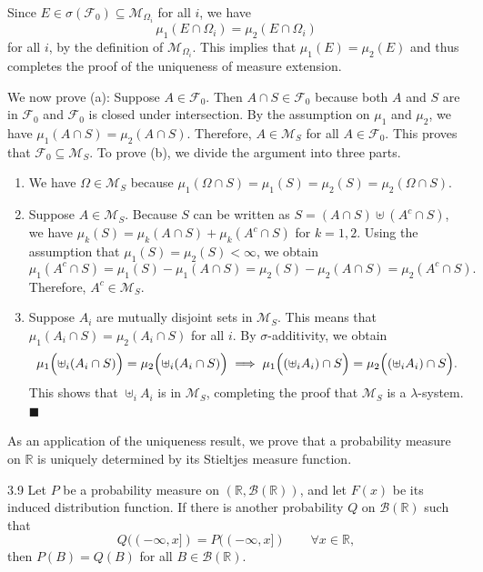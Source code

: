 Since $E \in \sigma(\mathcal{F}_0) \subseteq \mathcal{M}_{\Omega_i}$ for all $i$, we have
\[
\mu_1(E \cap \Omega_i) = \mu_2(E \cap \Omega_i)
\]
for all $i$, by the definition of $\mathcal{M}_{\Omega_i}$. This implies that $\mu_1(E) = \mu_2(E)$ and thus completes the proof of the uniqueness of measure extension.

We now prove (a): Suppose $A \in \mathcal{F}_0$. Then $A \cap S \in \mathcal{F}_0$ because both $A$ and $S$ are in $\mathcal{F}_0$ and $\mathcal{F}_0$ is closed under intersection. By the assumption on $\mu_1$ and $\mu_2$, we have $\mu_1(A \cap S) = \mu_2(A \cap S)$. Therefore, $A \in \mathcal{M}_S$ for all $A \in \mathcal{F}_0$. This proves that $\mathcal{F}_0 \subseteq \mathcal{M}_S$.
To prove (b), we divide the argument into three parts.
\begin{enumerate}
    \item We have $\Omega \in \mathcal{M}_S$ because $\mu_1(\Omega \cap S) = \mu_1(S) = \mu_2(S) = \mu_2(\Omega \cap S)$.
    \item Suppose $A \in \mathcal{M}_S$. Because $S$ can be written as $S = (A \cap S) \uplus (A^c \cap S)$, we have $\mu_k(S) = \mu_k(A \cap S) + \mu_k(A^c \cap S)$ for $k = 1, 2$. Using the assumption that $\mu_1(S) = \mu_2(S) < \infty$, we obtain
    \[
    \mu_1(A^c \cap S) = \mu_1(S) - \mu_1(A \cap S) = \mu_2(S) - \mu_2(A \cap S) = \mu_2(A^c \cap S).
    \]
    Therefore, $A^c \in \mathcal{M}_S$.
    \item Suppose $A_i$ are mutually disjoint sets in $\mathcal{M}_S$. This means that $\mu_1(A_i \cap S) = \mu_2(A_i \cap S)$ for all $i$. By $\sigma$-additivity, we obtain
    \[
    \mu_1\Bigl( \uplus_i (A_i \cap S) \Bigr) = \mu_2\Bigl( \uplus_i (A_i \cap S) \Bigr) \implies \mu_1\Bigl( (\uplus_i A_i) \cap S \Bigr) = \mu_2\Bigl( (\uplus_i A_i) \cap S \Bigr).
    \]
    This shows that $\uplus_i A_i$ is in $\mathcal{M}_S$, completing the proof that $\mathcal{M}_S$ is a $\lambda$-system. \hfill $\blacksquare$
\end{enumerate}

As an application of the uniqueness result, we prove that a probability measure on $\mathbb{R}$ is uniquely determined by its Stieltjes measure function.

\begin{thmbox}{3.9}
Let $P$ be a probability measure on $(\mathbb{R}, \mathcal{B}(\mathbb{R}))$, and let $F(x)$ be its induced distribution function. If there is another probability $Q$ on $\mathcal{B}(\mathbb{R})$ such that
\[
Q((-\infty, x]) = P((-\infty, x]) \qquad \forall x \in \mathbb{R},
\]
then $P(B) = Q(B)$ for all $B \in \mathcal{B}(\mathbb{R})$.
\end{thmbox}

